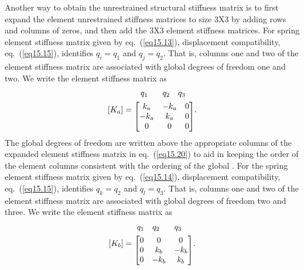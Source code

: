 \documentclass{AeroStructure-ERJohnson}
\begin{document}
Another way to obtain the unrestrained structural stiffness matrix is to first expand the element unrestrained stiffness matrices to size 3X3 by adding rows and columns of zeros, and then add the 3X3 element stiffness matrices. For spring element stiffness matrix given by eq.~(\ref{eq15.13}), displacement compatibility, eq.~(\ref{eq15.15}), identifies $q_{i}=q_{1}$ and $q_{j}=q_{2}$. That is, columns one and two of the element stiffness matrix are associated with global degrees of freedom one and two. We write the element stiffness matrix\vspace*{-3pt} as
\begin{align}\label{eq15.20}
\left[K_{a}\right]=
\begin{array}{@{}l@{}}
{\begin{array}{@{}l@{}}\hspace*{8pt}  q_{1} \hspace*{18pt} q_{2} \hspace*{10pt} q_{3} \end{array}}\\[4pt]
\left[\begin{array}{@{}ccc@{}}
k_{a} & -k_{a} & 0 \\
-k_{a} & k_{a} & 0 \\
0 & 0 & 0
\end{array}
\right]
\end{array}.
\end{align}
The global degrees of freedom are written above the appropriate columns of the expanded element stiffness matrix in eq.~(\ref{eq15.20}) to aid in keeping the order of the element columns consistent with the ordering\vadjust{\pagebreak} of the global . For the spring element stiffness matrix given by eq.~(\ref{eq15.14}), displacement compatibility, eq.~(\ref{eq15.15}), identifies $q_{k}=q_{2}$ and $q_{l}=q_{3}$. That is, columns one and two of the element stiffness matrix are associated with global degrees of freedom two and three. We write the element stiffness matrix as
\begin{align}\label{eq15.21}
\left[K_{b}\right]=
\begin{array}{@{}l@{}}
{\begin{array}{@{}l@{}}\ q_{1} \hspace*{10pt} q_{2} \hspace*{18pt} q_{3} \end{array}}\\[4pt]
\left[\begin{array}{@{}ccc@{}}
0 & 0 & 0 \\0 & k_{b} & -k_{b} \\0 & -k_{b} & k_{b}
\end{array}\right]
\end{array}.
\end{align}
\end{document}
